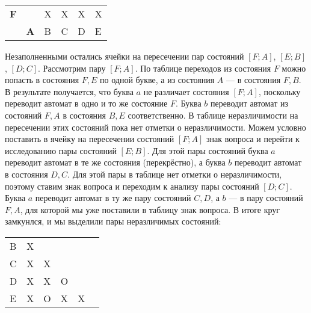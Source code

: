 \begin{myexample}
\begin{center}
\begin{tabular}{llllll}
\multicolumn{1}{l|}{\textbf{F}} & \multicolumn{1}{l|}{}  & \multicolumn{1}{l|}{X} & \multicolumn{1}{l|}{X} & \multicolumn{1}{l|}{X} & \multicolumn{1}{l|}{X} \\ \cline{2-6}
                                & \textbf{A}             & B                      & C                      & D                      & E
\end{tabular}
\end{center}
Незаполненными остались ячейки на пересечении пар состояний $[F;A]$, $[E;B]$, $[D;C]$. Рассмотрим пару $[F;A]$. По таблице переходов из состояния $F$ можно попасть в состояния $F, E$ по одной букве, а из состояния $A$ --- в состояния $F, B$. В результате получается, что буква $a$ не различает состояния $[F;A]$, поскольку переводит автомат в одно и то же состояние $F$. Буква $b$ переводит автомат из состояний $F, A$ в состояния $B, E$ соответственно. В таблице неразличимости на пересечении этих состояний пока нет отметки о неразличимости. Можем условно поставить в ячейку на пересечении состояний $[F;A]$ знак вопроса и перейти к исследованию пары состояний $[E;B]$. Для этой пары состояний буква $a$ переводит автомат в те же состояния (перекрёстно), а буква $b$ переводит автомат в состояния $D, C$. Для этой пары в таблице нет отметки о неразличимости, поэтому ставим знак вопроса и переходим к анализу пары состояний  $[D;C]$. Буква $a$ переводит автомат в ту же пару состояний $C, D$, а $b$ --- в пару состояний $F, A$, для которой мы уже поставили в таблицу знак вопроса. В итоге круг замкунлся, и мы выделили пары неразличимых состояний:
 \\
\begin{center}
\begin{tabular}{llllll}
\cline{2-2}
\multicolumn{1}{l|}{B}          & \multicolumn{1}{l|}{X} &                        &                        &                        &                        \\ \cline{2-3}
\multicolumn{1}{l|}{C}          & \multicolumn{1}{l|}{X} & \multicolumn{1}{l|}{X} &                        &                        &                        \\ \cline{2-4}
\multicolumn{1}{l|}{D}          & \multicolumn{1}{l|}{X} & \multicolumn{1}{l|}{X} & \multicolumn{1}{l|}{O} &                        &                        \\ \cline{2-5}
\multicolumn{1}{l|}{E}          & \multicolumn{1}{l|}{X} & \multicolumn{1}{l|}{O} & \multicolumn{1}{l|}{X} & \multicolumn{1}{l|}{X} &                        \\ \cline{2-6}

\end{tabular}
\end{center}
\end{myexample}
